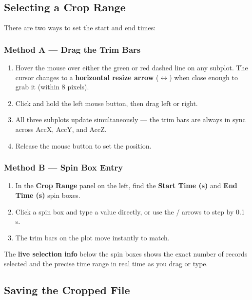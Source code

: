 \documentclass[12pt, a4paper]{article}
\newcommand{\key}[1]{%
  \fbox{\small\ttfamily #1}%
}
\begin{document}
\subsection{Selecting a Crop Range}

There are two ways to set the start and end times:

\subsubsection{Method A — Drag the Trim Bars}

\begin{enumerate}[leftmargin=*, label=\textbf{\arabic*.}]
  \item Hover the mouse over either the green or red dashed line on any subplot.
        The cursor changes to a \textbf{horizontal resize arrow} ($\leftrightarrow$)
        when close enough to grab it (within 8 pixels).
  \item Click and hold the left mouse button, then drag left or right.
  \item All three subplots update simultaneously — the trim bars are always
        in sync across AccX, AccY, and AccZ.
  \item Release the mouse button to set the position.
\end{enumerate}

\subsubsection{Method B — Spin Box Entry}

\begin{enumerate}[leftmargin=*, label=\textbf{\arabic*.}]
  \item In the \textbf{Crop Range} panel on the left, find the
        \textbf{Start Time (s)} and \textbf{End Time (s)} spin boxes.
  \item Click a spin box and type a value directly, or use the
        \key{$\uparrow$} / \key{$\downarrow$} arrows to step by 0.1 s.
  \item The trim bars on the plot move instantly to match.
\end{enumerate}

\begin{notebox}
The \textbf{live selection info} below the spin boxes shows the exact
number of records selected and the precise time range in real time as
you drag or type.
\end{notebox}

\subsection{Saving the Cropped File}
\end{document}

